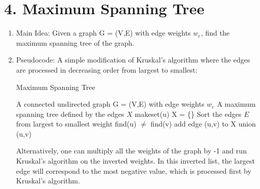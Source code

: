 \documentclass[11pt]{article}
\begin{document}
\section*{4. Maximum Spanning Tree}
\begin{enumerate}
\item Main Idea: Given a graph G = (V,E) with edge weights $w_e$, find the maximum spanning tree of the graph.
\item Pseudocode:
A simple modification of Kruskal's algorithm where the edges are processed in decreasing order from largest to smallest:
\begin{algorithm}
\caption{Maximum Spanning Tree}\label{euclid}
\begin{algorithmic}[1]
\Require A connected undirected graph G = (V,E) with edge weights $w_e$
\Ensure A maximum spanning tree defined by the edges $X$
\State makeset(u)
\EndFor
\State
\State X = \{\}
\State Sort the edges $E$ from largest to smallest weight
\If find(u) $\neq$ find(v)
\State add edge (u,v) to X
\State union (u,v)
\EndIf
\EndFor
\EndProcedure
\end{algorithmic}
\end{algorithm}
Alternatively, one can multiply all the weights of the graph by -1 and run Kruskal's algorithm on the inverted weights. In this inverted list, the largest edge will correspond to the most negative value, which is processed first by Kruskal's algorithm.



\end{enumerate}
\end{document}
